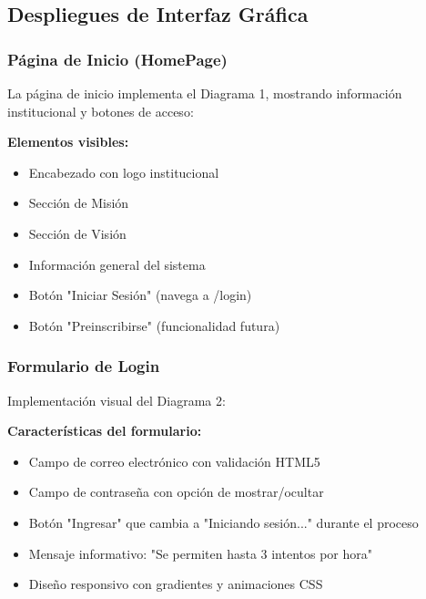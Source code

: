 \documentclass[11pt,a4paper]{article}
\begin{document}
\subsection{Despliegues de Interfaz Gráfica}

\subsubsection{Página de Inicio (HomePage)}

La página de inicio implementa el Diagrama 1, mostrando información institucional y botones de acceso:


\textbf{Elementos visibles:}
\begin{itemize}
    \item Encabezado con logo institucional
    \item Sección de Misión
    \item Sección de Visión
    \item Información general del sistema
    \item Botón "Iniciar Sesión" (navega a /login)
    \item Botón "Preinscribirse" (funcionalidad futura)
\end{itemize}

\subsubsection{Formulario de Login}

Implementación visual del Diagrama 2:


\textbf{Características del formulario:}
\begin{itemize}
    \item Campo de correo electrónico con validación HTML5
    \item Campo de contraseña con opción de mostrar/ocultar
    \item Botón "Ingresar" que cambia a "Iniciando sesión..." durante el proceso
    \item Mensaje informativo: "Se permiten hasta 3 intentos por hora"
    \item Diseño responsivo con gradientes y animaciones CSS
\end{itemize}
\end{document}
